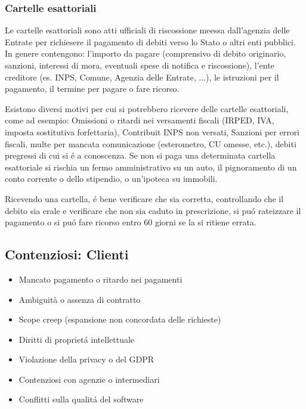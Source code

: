 \documentclass{article}
\begin{document}
\subsubsection{Cartelle esattoriali}
Le cartelle esattoriali sono atti ufficiali di riscossione meessa dall'agenzia delle Entrate per richiesere il pagamento di debiti verso lo Stato o altri enti pubblici. In genere contengono: l'importo da pagare (comprensivo di debito originario, sanzioni, interessi di mora, eventuali spese di notifica e riscossione), l'ente creditore (es. INPS, Comune, Agenzia delle Entrate, ...), le istruzioni per il pagamento, il termine per pagare o fare ricorso. 

Esistono diversi motivi per cui si potrebbero ricevere delle cartelle esattoriali, come ad esempio: Omissioni o ritardi nei versamenti fiscali (IRPED, IVA, imposta sostitutiva forfettaria), Contribuit INPS non versati, Sanzioni per errori fiscali, multe per mancata comunicazione (esterometro, CU omesse, etc.), debiti pregressi di cui si \'e a conoscenza. Se non si paga una determinata cartella esattoriale si rischia un fermo amministrativo su un auto, il pignoramento di un conto corrente o dello stipendio, o un'ipoteca su immobili. 

Ricevendo una cartella, \'e bene verificare che sia corretta, controllando che il debito sia erale e verificare che non sia caduto in prescrizione, si pu\'o rateizzare il pagamento o si pu\'o fare ricorso entro 60 giorni se la si ritiene errata. 


\subsection{Contenziosi: Clienti}
\begin{itemize}
    \item Mancato pagamento o ritardo nei pagamenti
    \item Ambiguità o assenza di contratto
    \item Scope creep (espansione non concordata delle richieste)
    \item Diritti di propriet\'a intellettuale
    \item Violazione della privacy o del GDPR
    \item Contenziosi con agenzie o intermediari
    \item Conflitti sulla qualit\'a del software
\end{itemize}
\end{document}
